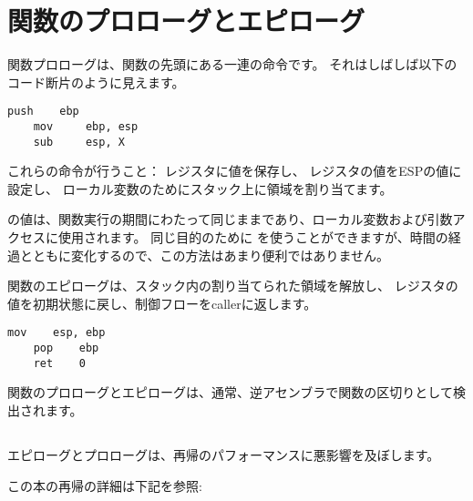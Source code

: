 \section{関数のプロローグとエピローグ}
\label{sec:prologepilog}

関数プロローグは、関数の先頭にある一連の命令です。 それはしばしば以下のコード断片のように見えます。

\begin{lstlisting}[style=customasmx86]
    push    ebp
    mov     ebp, esp
    sub     esp, X
\end{lstlisting}

これらの命令が行うこと： \EBP レジスタに値を保存し、
\EBP レジスタの値をESPの値に設定し、
ローカル変数のためにスタック上に領域を割り当てます。

\EBP の値は、関数実行の期間にわたって同じままであり、ローカル変数および引数アクセスに使用されます。 
同じ目的のために \ESP を使うことができますが、時間の経過とともに変化するので、この方法はあまり便利ではありません。

関数のエピローグは、スタック内の割り当てられた領域を解放し、 \EBP レジスタの値を初期状態に戻し、制御フローを\gls{caller}に返します。

\begin{lstlisting}[style=customasmx86]
    mov    esp, ebp
    pop    ebp
    ret    0
\end{lstlisting}

関数のプロローグとエピローグは、通常、逆アセンブラで関数の区切りとして検出されます。

\subsection{\Recursion}

\myindex{\Recursion}
エピローグとプロローグは、再帰のパフォーマンスに悪影響を及ぼします。

この本の再帰の詳細は下記を参照: 
